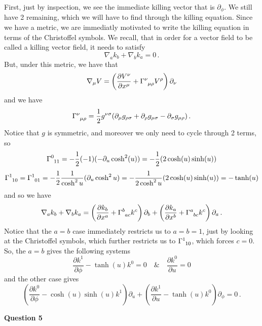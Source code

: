 \documentclass[10pt]{article}
\begin{document}
First, just by inspection, we see the immediate killing vector that is $\partial_{\phi}$. We still have 2 remaining, which we will have to find through the killing equation. Since we have a metric, we are immediatly motivated to write the killing equation in terms of the Christoffel symbols. We recall, that in order for a vector field to be called a killing vector field, it needs to satisfy
\[ \nabla_{a}k_{b} + \nabla_{b}k_{a} = 0 \, .\]
But, under this metric, we have that
\[ \nabla_{\mu}V = \left(\frac{\partial V^{\nu}}{\partial x^{\mu}} + \tensor{\Gamma}{^{\nu}_{\mu\rho}}V^{\rho}\right)\partial_{\nu} \]
and we have
\[ \tensor{\Gamma}{^{\nu}_{\mu\rho}} = \frac{1}{2}g^{\nu\sigma}(\partial_{\mu}g_{\rho\sigma} + \partial_{\rho}g_{\mu\sigma} - \partial_{\sigma}g_{\mu\rho})\, . \]
Notice that $g$ is symmetric, and moreover we only need to cycle through 2 terms, so
\[ \tensor{\Gamma}{^{0}_{11}} = -\frac{1}{2}(-1)(-\partial_{u}\cosh^{2}(u)) = -\frac{1}{2}(2\cosh(u)\sinh(u)) \]
\[ \tensor{\Gamma}{^{1}_{10}} = \tensor{\Gamma}{^{1}_{01}} = -\frac{1}{2}\frac{1}{\cosh^{2}u}(\partial_{u}\cosh^{2}u) = -\frac{1}{2\cosh^{2}u}(2\cosh(u)\sinh(u)) = -\tanh(u) \]
and so we have
\[ \nabla_{a}k_{b} + \nabla_{b}k_{a} = \left(\frac{\partial k_{b}}{\partial x^{a}} + \tensor{\Gamma}{^{b}_{ac}}k^{c}\right)\partial_{b} + \left(\frac{\partial k_{a}}{\partial x^{b}} + \tensor{\Gamma}{^{a}_{bc}}k^{c}\right)\partial_{a}\, . \]
Notice that the $a=b$ case immediately restricts us to $a=b=1$, just by looking at the Christoffel symbols, which further restricts us to $\tensor{\Gamma}{^{1}_{10}}$, which forces $c=0$. So, the $a=b$ gives the following systems
\[ \frac{\partial k^{1}}{\partial \phi} - \tanh (u)k^{0} = 0 \quad \& \quad \frac{\partial k^{0}}{\partial u} = 0\]
and the other case gives
\[ \left(\frac{\partial k^{0}}{\partial \phi} - \cosh(u)\sinh(u)k^{1}\right)\partial_{u} + \left(\frac{\partial k^{1}}{\partial u} - \tanh(u)k^{0}\right)\partial_{\phi} = 0\, .\]

\newpage
\textbf{Question 5}
\end{document}
